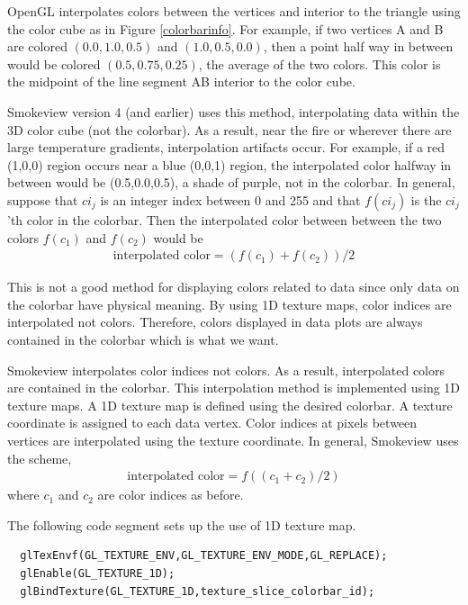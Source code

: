 \documentclass[11pt,twoside]{book}
\begin{document}
OpenGL interpolates colors between the vertices and interior to
the triangle using the color cube as in Figure \ref{colorbarinfo}.
For example, if two vertices A and B are colored $(0.0,1.0,0.5)$
and $(1.0,0.5,0.0)$, then a point half way in between would be
colored $(0.5,0.75,0.25)$, the average of the two colors.  This
color is the midpoint of the line segment AB interior to the color
cube.

Smokeview version 4 (and earlier) uses this method, interpolating
data within the 3D color cube (not the colorbar).  As a result,
near the fire or wherever there are large temperature gradients,
interpolation artifacts occur.  For example, if a red (1,0,0)
region occurs near a blue (0,0,1) region, the interpolated color
halfway in between would be (0.5,0.0,0.5), a shade of purple, not
in the colorbar.  In general, suppose that $ci_j$ is an integer
index between 0 and 255 and that $f(ci_j)$ is the $ci_j$'th color
in the colorbar.  Then the interpolated color between between the
two colors $f(c_1)$ and $f(c_2)$ would be
\begin{eqnarray}
\mbox{interpolated color}=(f(c_1)+f(c_2))/2
\end{eqnarray}

This is not a good method for displaying colors related to data
since only data on the colorbar have physical meaning.  By using
1D texture maps, color indices are interpolated not colors.
Therefore, colors displayed in data plots are always contained in
the colorbar which is what we want.

Smokeview interpolates color indices not colors. As a
result, interpolated colors are contained in the colorbar.  This
interpolation method is implemented using 1D texture maps.  A 1D
texture map is defined using the desired colorbar.  A texture
coordinate is assigned to each data vertex.    Color indices at
pixels between vertices are interpolated using the texture
coordinate.  In general, Smokeview uses the scheme,
\begin{eqnarray}
\mbox{interpolated color}=f((c_1+c_2)/2)
\end{eqnarray}
where $c_1$ and $c_2$ are color indices as before.

The following code segment sets up the use of 1D texture map.

\begin{lstlisting}
  glTexEnvf(GL_TEXTURE_ENV,GL_TEXTURE_ENV_MODE,GL_REPLACE);
  glEnable(GL_TEXTURE_1D);
  glBindTexture(GL_TEXTURE_1D,texture_slice_colorbar_id);
\end{lstlisting}
\end{document}
